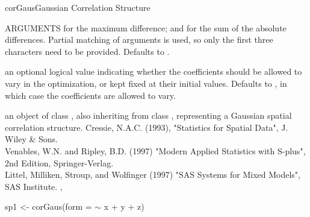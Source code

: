 \documentclass[pdftex]{article} \usepackage{url,graphicx}
\renewcommand{\Twiddle}{\mbox{\(\sim\)}}
\begin{document}
\begin{Helpfile}{corGaus}{Gaussian Correlation Structure}
\begin{Argument}{ARGUMENTS}
 for the maximum difference; and 
for the sum of the absolute differences. Partial matching of
arguments is used, so only the first three characters need to be
provided. Defaults to .
\item[\Co{fixed:}]
an optional logical value indicating whether the
coefficients should be allowed to vary in the optimization, or kept
fixed at their initial values. Defaults to , in which case
the coefficients are allowed to vary.
\end{Argument}
an object of class , also inheriting from class
, representing a Gaussian spatial correlation
structure.
  Cressie, N.A.C. (1993), "Statistics for Spatial Data", J. Wiley \& Sons.\\
Venables, W.N. and Ripley, B.D. (1997) "Modern Applied Statistics with
S-plus", 2nd Edition, Springer-Verlag.\\
Littel, Milliken, Stroup, and Wolfinger (1997) "SAS Systems for Mixed
Models", SAS Institute.
, 
\need 15pt
\vspace{-16pt}
\begin{Example}
sp1 <- corGaus(form = {\Twiddle} x + y + z)
\end{Example}
\end{Helpfile}
\end{document}
